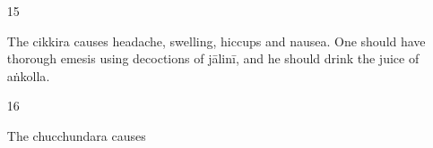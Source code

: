 \begin{translation}
\begin{itemize}
\item[15]

The \Gls{cikkira} causes headache, swelling, hiccups and nausea.  One
should have thorough emesis using
decoctions of \gls{jālinī}, and he should drink
the juice of \gls{aṅkolla}.

\item[16]

The \Gls{chucchundara} causes 

\end{itemize}

    \end{translation}
\endinput




%


